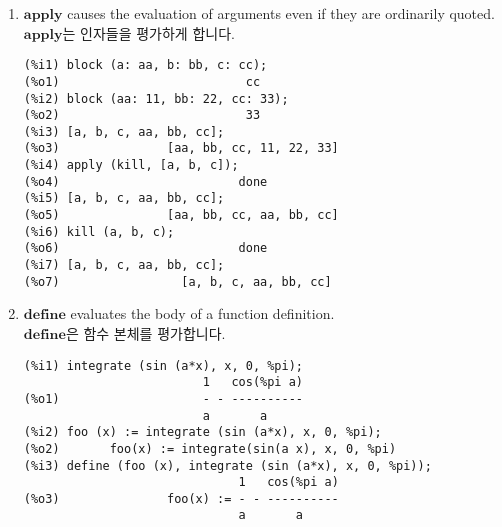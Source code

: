 \documentclass[12pt]{article}
\begin{document}
\begin{enumerate}
\begin{verbatim}
(%i1) block (xx: yy, yy: zz);
(%o1)                          zz
(%i2) [xx, yy];
(%o2)                       [yy, zz]
(%i3) foo (x) := ''x;
(%o3)                      foo(x) := x
(%i4) foo (xx);
(%o4)                          yy
(%i5) bar (x) := ev (x);
(%o5)                    bar(x) := ev(x)
(%i6) bar (xx);
(%o6)                          zz
\end{verbatim}

\item $\mathbf{apply}$ causes the evaluation of arguments even if they are ordinarily quoted. \\
$\mathbf{apply}$는 인자들을 평가하게 합니다. 

\begin{verbatim}
(%i1) block (a: aa, b: bb, c: cc);
(%o1)                          cc
(%i2) block (aa: 11, bb: 22, cc: 33);
(%o2)                          33
(%i3) [a, b, c, aa, bb, cc];
(%o3)               [aa, bb, cc, 11, 22, 33]
(%i4) apply (kill, [a, b, c]);
(%o4)                         done
(%i5) [a, b, c, aa, bb, cc];
(%o5)               [aa, bb, cc, aa, bb, cc]
(%i6) kill (a, b, c);
(%o6)                         done
(%i7) [a, b, c, aa, bb, cc];
(%o7)                 [a, b, c, aa, bb, cc]
\end{verbatim}

\item $\mathbf{define}$ evaluates the body of a function definition. \\
 $\mathbf{define}$은 함수 본체를 평가합니다.

\begin{verbatim}
(%i1) integrate (sin (a*x), x, 0, %pi);
                         1   cos(%pi a)
(%o1)                    - - ----------
                         a       a
(%i2) foo (x) := integrate (sin (a*x), x, 0, %pi);
(%o2)       foo(x) := integrate(sin(a x), x, 0, %pi)
(%i3) define (foo (x), integrate (sin (a*x), x, 0, %pi));
                              1   cos(%pi a)
(%o3)               foo(x) := - - ----------
                              a       a
\end{verbatim}

\end{enumerate}
\end{document}
